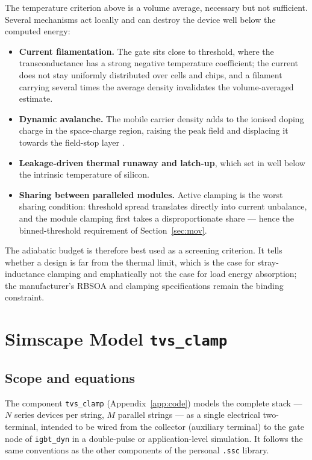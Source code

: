 \documentclass[11pt,a4paper]{article}
\begin{document}
The temperature criterion above is a volume average, necessary but not
sufficient. Several mechanisms act locally and can destroy the device
well below the computed energy:

\begin{itemize}
  \item \textbf{Current filamentation.} The gate sits close to
        threshold, where the transconductance has a strong negative
        temperature coefficient; the current does not stay uniformly
        distributed over cells and chips, and a filament carrying
        several times the average density invalidates the
        volume-averaged estimate.
  \item \textbf{Dynamic avalanche.} The mobile carrier density adds to
        the ionised doping charge in the space-charge region, raising
        the peak field and displacing it towards the field-stop layer
        \cite{lutz}.
  \item \textbf{Leakage-driven thermal runaway and latch-up}, which set
        in well below the intrinsic temperature of silicon.
  \item \textbf{Sharing between paralleled modules.} Active clamping is
        the worst sharing condition: threshold spread translates
        directly into current unbalance, and the module clamping first
        takes a disproportionate share --- hence the binned-threshold
        requirement of Section~\ref{sec:mov}.
\end{itemize}

The adiabatic budget is therefore best used as a screening criterion. It
tells whether a design is far from the thermal limit, which is the case
for stray-inductance clamping and emphatically not the case for load
energy absorption; the manufacturer's RBSOA and clamping specifications
remain the binding constraint.

\section{Simscape Model \texttt{tvs\_clamp}}

\subsection{Scope and equations}

The component \texttt{tvs\_clamp} (Appendix~\ref{app:code}) models the
complete stack --- $N$ series devices per string, $M$ parallel strings
--- as a single electrical two-terminal, intended to be wired from the
collector (auxiliary terminal) to the gate node of \texttt{igbt\_dyn}
in a double-pulse or application-level simulation. It follows the same
conventions as the other components of the personal \texttt{.ssc}
library.
\end{document}

